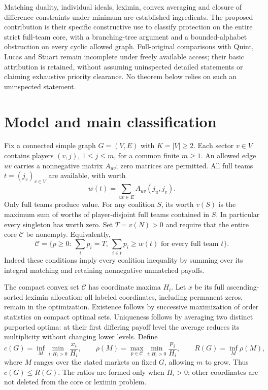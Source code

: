 \documentclass[11pt]{article}
\theoremstyle{remark}\newtheorem{remark}[theorem]{Remark}
\newcommand{\core}{\mathcal C}
\begin{document}
Matching duality, individual ideals, leximin, convex averaging and closure
of difference constraints under minimum are established ingredients. The
proposed contribution is their specific constructive use to classify
protection on the entire strict full-team core, with a branching-tree
argument and a bounded-alphabet obstruction on every cyclic allowed graph.
Full-original comparisons with Quint, Lucas and Stuart remain incomplete
under freely available access; their basic attribution is retained, without
assuming uninspected detailed statements or claiming exhaustive priority
clearance. No theorem below relies on such an uninspected statement.

\section{Model and main classification}
Fix a connected simple graph $G=(V,E)$ with $K=|V|\ge2$. Each sector $v\in V$
contains players $(v,j)$, $1\le j\le m$, for a common finite $m\ge1$.
An allowed edge $uv$ carries a nonnegative matrix $A_{uv}$; zero matrices
are permitted. All full teams $t=(j_v)_{v\in V}$ are available, with worth
\[
 w(t)=\sum_{uv\in E}A_{uv}(j_u,j_v).
\]
Only full teams produce value. For any coalition $S$, its worth $v(S)$ is the
maximum sum of worths of player-disjoint full teams contained in $S$.
In particular every singleton has worth zero. Set $T=v(N)>0$ and require
that the entire core $\core$ be nonempty. Equivalently,
\begin{equation}\label{eq:core}
 \core=\{p\ge0:\ \sum_i p_i=T,\ \sum_{i\in t}p_i\ge w(t)
                    \text{ for every full team }t\}.
\end{equation}
Indeed these conditions imply every coalition inequality by summing over
its integral matching and retaining nonnegative unmatched payoffs.

The compact convex set $\core$ has coordinate maxima $H_i$. Let $x$ be its
full ascending-sorted leximin allocation; all labeled coordinates, including
permanent zeros, remain in the optimization. Existence follows by successive
maximization of order statistics on compact optimal sets. Uniqueness follows
by averaging two distinct purported optima: at their first differing payoff
level the average reduces its multiplicity without changing lower levels.
Define
\[
 c(G)=\inf_M\min_{i:H_i>0}\frac{x_i}{H_i},\qquad
 \rho(M)=\max_{p\in\core}\min_{i:H_i>0}\frac{p_i}{H_i},\qquad
 R(G)=\inf_M\rho(M),
\]
where $M$ ranges over the stated markets on fixed $G$, allowing $m$ to grow.
Thus $c(G)\le R(G)$. The ratios are formed only when $H_i>0$; other
coordinates are not deleted from the core or leximin problem.
\end{document}
